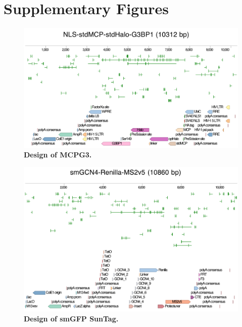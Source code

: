 \chapter{Supplementary Figures}

\begin{figure}[h]
    \centering
    \includegraphics[width=\linewidth]{images/figureA1}
    \caption{\textbf{Design of MCPG3.}}
    \label{fig:plasmid_1}
\end{figure}

\begin{figure}[h]
    \centering
    \includegraphics[width=\linewidth]{images/figureA2}
    \caption{\textbf{Design of smGFP SunTag.}}
    \label{fig:plasmid_2}
\end{figure}
